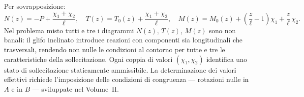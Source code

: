 \begin{esempio}
\begin{svolgimento}
		
		Per sovrapposizione:
		\[
		N(z) = -P + \frac{\chi_1 + \chi_2}{\ell},
		\quad
		T(z) = T_0(z) + \frac{\chi_1 + \chi_2}{\ell},
		\quad
		M(z) = M_0(z)
		+ \left(\frac{z}{\ell} - 1\right)\chi_1
		+ \frac{z}{\ell}\,\chi_2.
		\]
		Nel problema misto tutti e tre i diagrammi
		$N(z)$, $T(z)$, $M(z)$ sono non banali: il
		glifo inclinato introduce reazioni con
		componenti sia longitudinali che trasversali,
		rendendo non nulle le condizioni al contorno
		per tutte e tre le caratteristiche della
		sollecitazione.
		Ogni coppia di valori $(\chi_1, \chi_2)$
		identifica uno stato di sollecitazione
		staticamente ammissibile. La determinazione
		dei valori effettivi richiede l'imposizione
		delle condizioni di congruenza --- rotazioni
		nulle in $A$ e in $B$ --- sviluppate nel
		Volume~II.
		
	\end{svolgimento}
\end{esempio}
